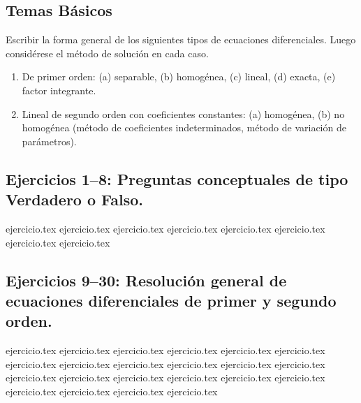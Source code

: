 
\subsection*{Temas Básicos}

Escribir la forma general de los siguientes tipos de ecuaciones diferenciales. Luego considérese el método de solución en cada caso.

\begin{enumerate}
    \item De primer orden: (a) separable, (b) homogénea, (c) lineal, (d) exacta, (e) factor integrante.
    \item Lineal de segundo orden con coeficientes constantes: (a) homogénea, (b) no homogénea (método de coeficientes indeterminados, método de variación de parámetros).
\end{enumerate}

\subsection*{Ejercicios 1--8: Preguntas conceptuales de tipo Verdadero o Falso.}
\begin{enumerate}
    {ejercicio.tex}
    {ejercicio.tex}
    {ejercicio.tex}
    {ejercicio.tex}
    {ejercicio.tex}
    {ejercicio.tex}
    {ejercicio.tex}
    {ejercicio.tex}
\end{enumerate}

\subsection*{Ejercicios 9--30: Resolución general de ecuaciones diferenciales de primer y segundo orden.}
\begin{enumerate}
    \setcounter{enumi}{8}
    {ejercicio.tex}
    {ejercicio.tex}
    {ejercicio.tex}
    {ejercicio.tex}
    {ejercicio.tex}
    {ejercicio.tex}
    {ejercicio.tex}
    {ejercicio.tex}
    {ejercicio.tex}
    {ejercicio.tex}
    {ejercicio.tex}
    {ejercicio.tex}
    {ejercicio.tex}
    {ejercicio.tex}
    {ejercicio.tex}
    {ejercicio.tex}
    {ejercicio.tex}
    {ejercicio.tex}
    {ejercicio.tex}
    {ejercicio.tex}
    {ejercicio.tex}
    {ejercicio.tex}
\end{enumerate}

